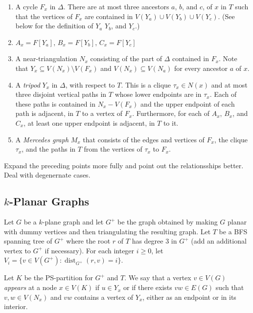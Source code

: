 \documentclass{patmorin}
\DeclareMathOperator{\dist}{dist}
\begin{document}
\begin{enumerate}
  \item  A cycle $F_x$ in $\Delta$.  There are at most three ancestors $a$, $b$, and $c$, of $x$ in $T$ such that the vertices of $F_x$ are contained in $V(Y_a)\cup V(Y_b)\cup V(Y_c)$. (See below for the definition of $Y_a$ $Y_b$, and $Y_c$.)
  
  \item $A_x=F[Y_a]$, $B_x=F[Y_b]$, $C_x=F[Y_c]$
  
  \item A near-triangulation $N_x$ consisting of the part of $\Delta$ contained in $F_x$.  Note that $Y_x\subseteq V(N_x)\setminus V(F_x)$ and $V(N_x)\subseteq V(N_a)$ for every ancestor $a$ of $x$.

  \item A \emph{tripod} $Y_x$ in $\Delta$, with respect to $T$. This is a clique $\tau_x\in N(x)$ and at most three disjoint vertical paths in $T$ whose lower endpoints are in $\tau_x$.  Each of these paths is contained in $N_x-V(F_x)$ and the upper endpoint of each path is adjacent, in $T$ to a vertex of $F_x$.  Furthermore, for each of $A_x$, $B_x$, and $C_x$, at least one upper endpoint is adjacent, in $T$ to it.  
  
  \item A \emph{Mercedes graph} $M_x$ that consists of the edges and vertices of $F_x$, the clique $\tau_x$, and the paths in $T$ from the vertices of $\tau_x$ to $F_x$.
\end{enumerate}  

{\color{red}Expand the preceding points more fully and point out the relationsships better.  Deal with degenernate cases.}

\subsection{$k$-Planar Graphs}

Let $G$ be a $k$-plane graph and let $G^+$ be the graph obtained by making $G$ planar with dummy vertices and then triangulating the resulting graph. Let $T$ be a BFS spanning tree of $G^+$ where the root $r$ of $T$ has degree 3 in $G^+$ (add an additional vertex to $G^+$ if necessary). For each integer $i\ge 0$, let $V_i=\{v\in V(G^+): \dist_{G^+}(r,v)=i\}$.

Let $K$ be the PS-partition for $G^+$ and $T$.  We say that a vertex $v\in V(G)$ \emph{appears} at a node $x\in V(K)$ if $u\in Y_x$ or if there exists $vw\in E(G)$ such that $v,w\in V(N_x)$ and $vw$ contains a vertex of $Y_x$, either as an endpoint or in its interior.
\end{document}
